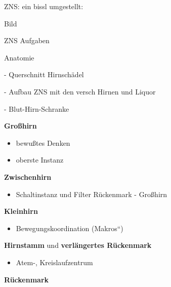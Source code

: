 \documentclass{article}
\newcommand\gT[1]{\textbf{\textup{\textcolor[rgb]{0.0,0.5019608,0.0}{#1}}}}
\begin{document}
\begin{center}
\begin{minipage}{4.001cm}
{\mdseries
ZNS: ein bissl umgestellt:}

{\mdseries
Bild}

{\mdseries
ZNS Aufgaben}

{\mdseries
Anatomie}

{\mdseries
{}- Querschnitt Hirnsch\"adel}

{\mdseries
{}- Aufbau ZNS mit den versch Hirnen und Liquor}

{\mdseries
{}- Blut-Hirn-Schranke}

\end{minipage}
\end{center}
{\mdseries
{}\gT{Gro{\ss}hirn}}

\begin{itemize}
\item {\mdseries
bewu{\ss}tes Denken}

\item {\mdseries
oberste Instanz}

\end{itemize}
{\mdseries
{}\gT{Zwischenhirn}}

\begin{itemize}
\item {\mdseries
Schaltinstanz und Filter R\"uckenmark - Gro{\ss}hirn}

\end{itemize}
{\mdseries
{}\gT{Kleinhirn}}

\begin{itemize}
\item {\mdseries
Bewegungskoordination ({\quotedblbase}Makros{\textquotedblleft})}

\end{itemize}
{\mdseries
{}\gT{Hirnstamm} und \gT{verl\"angertes R\"uckenmark}}

\begin{itemize}
\item {\mdseries
Atem-, Kreislaufzentrum}

\end{itemize}
{\mdseries
{}\gT{R\"uckenmark}}
\end{document}
